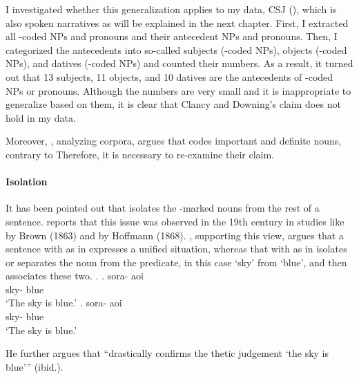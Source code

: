 I investigated whether this generalization applies to
my data, CSJ (), which is also spoken narratives as will be explained in the next chapter.
First, I extracted all -coded NPs and pronouns and their antecedent NPs and pronouns.
Then, I categorized the antecedents into
so-called subjects (-coded NPs),
objects (-coded NPs), and datives (-coded NPs) and
counted their numbers.
As a result,
it turned out that
13 subjects, 11 objects, and 10 datives are the antecedents of
-coded NPs or pronouns.
Although the numbers are very small and it is inappropriate to generalize based on them,
it is clear that
Clancy and Downing's claim does not hold in my data.

Moreover, \cite{watanabe89}, analyzing corpora, argues that
 codes important and definite nouns, contrary to \cite{clancydowning87}
Therefore, it is necessary to re-examine their claim.


\paragraph{Isolation}


It has been pointed out that
 isolates the -marked nouns from the rest of a sentence.
 reports that this issue was observed in the 19th century
in studies like  by Brown (1863) and
 by Hoffmann (1868).
, supporting this view,
argues that a sentence with  as in \Next[a] expresses a unified situation,
whereas that with  as in \Next[b] isolates or separates
the noun from the predicate,
in this case
 `sky' from  `blue',
and then associates these two.
%
\ex.
 \ag. sora- aoi \\
      sky- blue \\
      `The sky is blue.'
 \bg. sora- aoi \\
      sky- blue \\
      `The sky is blue.'

He further argues that
 ``drastically confirms the thetic judgement `the sky is blue'{''} (ibid.).

